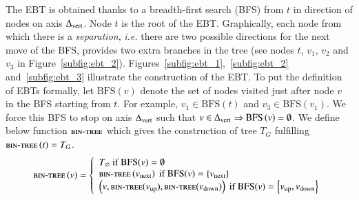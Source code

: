\documentclass[preprint]{elsarticle}
\newcommand{\set}[1]{\left\{ #1 \right\}}
\newcommand{\deltavert}{\Delta_{\mbox{\scriptsize{vert}}}}
\newcommand{\bintree}{\textsc{bin-tree}}
\newcommand{\bfs}{\mbox{BFS}}
\begin{document}
The EBT is obtained thanks to a breadth-first search (BFS) from $t$ in direction of nodes on axis $\deltavert$. Node $t$ is the root of the EBT. Graphically, each node from which there is a \textit{separation}, {\em i.e.} there are two possible directions for the next move of the BFS, provides two extra branches in the tree (see nodes $t$, $v_1$, $v_2$ and $v_3$ in Figure~\ref{subfig:ebt_2}). Figures~\ref{subfig:ebt_1},~\ref{subfig:ebt_2} and~\ref{subfig:ebt_3} illustrate the construction of the EBT. To put the definition of EBTs formally, let $\bfs\left(v\right)$ denote the set of nodes visited just after node $v$ in the BFS starting from $t$. For example, $v_1 \in \bfs\left(t\right)$ and $v_3 \in \bfs\left(v_1\right)$. We force this BFS to stop on axis $\deltavert$ such that $v \in \deltavert \Rightarrow \bfs\left(v\right) = \emptyset$. We define below function $\bintree$ which gives the construction of tree $T_G$ fulfilling $\bintree \left(t\right) = T_G$.
\[
\bintree\left(v\right) = 
\left\{
\begin{array}{l}
T_\varnothing ~\mbox{if}~ \bfs(v) = \emptyset\\
\bintree\left(v_{\mbox{\scriptsize{next}}}\right)  ~\mbox{if}~ \bfs(v) = \set{v_{\mbox{\scriptsize{next}}}}\\
\left(v, \bintree(v_{\mbox{\scriptsize{up}}}), \bintree( v_{\mbox{\scriptsize{down}}})\right) ~\mbox{if}~ \bfs(v) = \set{v_{\mbox{\scriptsize{up}}},v_{\mbox{\scriptsize{down}}}}
\end{array}
\right.
\]

\end{document}
